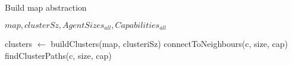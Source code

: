 \begin{algorithm}
\caption{Build map abstraction}
\label{aha-alg:buildabstraction}
\begin{algorithmic}
\REQUIRE $map, clusterSz, AgentSizes_{all}, Capabilities_{all}$

	\STATE clusters $\leftarrow$ buildClusters(map, clusteriSz)
				\STATE connectToNeighbours(c, size, cap)
				\STATE findClusterPaths(c, size, cap)
			\ENDFOR
		\ENDFOR
	\ENDFOR
\end{algorithmic}
\end{algorithm}
